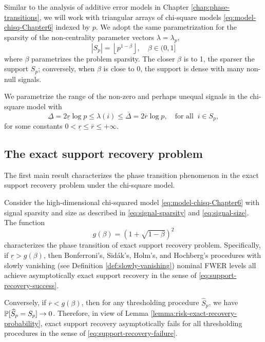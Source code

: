 
Similar to the analysis of additive error models in Chapter \ref{chap:phase-transitions}, we will work with triangular arrays of chi-square models \eqref{eq:model-chisq-Chapter6} indexed by $p$.
We adopt the same parametrization for the sparsity of the non-centrality parameter vectors $\lambda = \lambda_p$,
\begin{equation} \label{eq:signal-sparsity}
    |S_p| = \left\lfloor p^{1-\beta} \right\rfloor, \quad \beta\in(0,1]
\end{equation}
where $\beta$ parametrizes the problem sparsity.
The closer $\beta$ is to 1, the sparser the support $S_p$; conversely, when $\beta$ is close to 0, the support is dense with many non-null signals.

We parametrize the range of the non-zero and perhaps unequal signals in the chi-square model with
\begin{equation} \label{eq:signal-size}
    \underline{\Delta} = 2\underline{r}\log{p}
    \le \lambda(i) \le
    \overline{\Delta} = 2\overline{r}\log{p}, \quad \text{for all}\;\;i\in S_p,
\end{equation}
for some constants $0<\underline{r}\le\overline{r}\le+\infty$.

\subsection{The exact support recovery problem}
\label{subsec:exact-support-recovery-chisq}

The first main result characterizes the phase transition phenomenon in the exact support recovery problem under the chi-square model.

\begin{theorem} \label{thm:chi-squared-exact-boundary}
Consider the high-dimensional chi-squared model \eqref{eq:model-chisq-Chapter6} with signal sparsity and size as described in \eqref{eq:signal-sparsity} and \eqref{eq:signal-size}.
The function 
\begin{equation} \label{eq:exact-boundary-chisquared}
    g(\beta) = \left(1 + \sqrt{1-\beta}\right)^2
\end{equation}
characterizes the phase transition of exact support recovery problem.
Specifically, if $\underline{r} > {{g}}(\beta)$, then Bonferroni's, Sid\'ak's, Holm's, and Hochberg's procedures with slowly vanishing (see Definition \ref{def:slowly-vanishing}) nominal FWER levels all achieve asymptotically exact support recovery in the sense of \eqref{eq:support-recovery-success}. 

Conversely, if $\overline{r} < {{g}}(\beta)$, then for any thresholding procedure $\widehat{S}_p$, we have $\P[\widehat{S}_p=S_p]\to0$.
Therefore, in view of Lemma \ref{lemma:risk-exact-recovery-probability}, exact support recovery asymptotically fails for all thresholding procedures in the sense of \eqref{eq:support-recovery-failure}.
\end{theorem}

